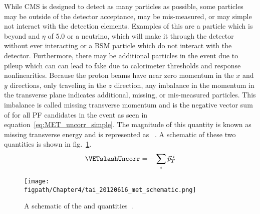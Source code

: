 While CMS is designed to detect as many particles as possible, some particles may be outside of the detector acceptance, may be mis-measured, or may simple not interact with the detection elements.
Examples of this are a particle which is beyond and $\eta$ of 5.0 or a neutrino, which will make it through the detector without ever interacting or a BSM particle which do not interact with the detector.
Furthermore, there may be additional particles in the event due to pileup which can can lead to fake \VETslash due to calorimeter thresholds and response nonlinearities.
Because the proton beams have near zero momentum in the $x$ and $y$ directions, only traveling in the $z$ direction, any imbalance in the momentum in the transverse plane indicates additional, missing, or mis-measured particles.
This imbalance is called missing transverse momentum and is the negative vector sum of \ptvec for all PF candidates in the event as seen in equation~\ref{eq:MET_uncorr_simple}.
The magnitude of this quantity is known as missing transverse energy and is represented as \ETslash~\cite{METperf2012}. A schematic of these two quantities is shown in fig.~\ref{fig:MET_schematic}.
\begin{equation}
\label{eq:MET_uncorr_simple}
\VETslashUncorr=-\sum_{i}{\vec{p}_{T}}^{\text{ }i}
\end{equation}

\begin{figure}[!hbt]
    \vspace*{-0.5cm}
    \centering
    \texttt{[image: \\figpath/Chapter4/tai\_20120616\_met\_schematic.png]}
    \caption{A schematic of the \VETslash and \ETslash quantities~\cite{METAnalysis}.}
    \label{fig:MET_schematic}
\end{figure}

